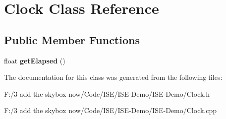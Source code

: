 \hypertarget{class_clock}{\section{Clock Class Reference}
\label{class_clock}
}
\subsection*{Public Member Functions}
\begin{DoxyCompactItemize}
\item 
\hypertarget{class_clock_a2787f0e91b0dbc751d8f91d7528eda87}{float {\bfseries get\-Elapsed} ()}\label{class_clock_a2787f0e91b0dbc751d8f91d7528eda87}

\end{DoxyCompactItemize}


The documentation for this class was generated from the following files\-:\begin{DoxyCompactItemize}
\item 
F\-:/3 add the skybox now/\-Code/\-I\-S\-E/\-I\-S\-E-\/\-Demo/\-I\-S\-E-\/\-Demo/Clock.\-h\item 
F\-:/3 add the skybox now/\-Code/\-I\-S\-E/\-I\-S\-E-\/\-Demo/\-I\-S\-E-\/\-Demo/Clock.\-cpp\end{DoxyCompactItemize}
